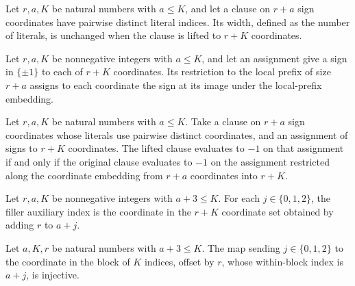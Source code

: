 \begin{theorem}
\label{FABL.liftLocalClause_width}
\leanok
{}
Let $r,a,K$ be natural numbers with $a\le K$, and let a clause on $r+a$ sign coordinates
have pairwise distinct literal indices. Its width, defined as the number of literals, is
unchanged when the clause is lifted to $r+K$ coordinates.
\end{theorem}

\begin{definition}
\label{FABL.restrictLocalAssignment}
\leanok
{}
Let $r,a,K$ be nonnegative integers with $a\le K$, and let an assignment give a sign in
$\{\pm1\}$ to each of $r+K$ coordinates. Its restriction to the local prefix of size
$r+a$ assigns to each coordinate the sign at its image under the local-prefix embedding.
\end{definition}

\begin{theorem}
\label{FABL.liftLocalClause_eval_eq_neg_one_iff}
\leanok
{}
Let $r,a,K$ be natural numbers with $a\le K$. Take a clause on $r+a$ sign coordinates
whose literals use pairwise distinct coordinates, and an assignment of signs to $r+K$
coordinates. The lifted clause evaluates to $-1$ on that assignment if and only if the
original clause evaluates to $-1$ on the assignment restricted along the coordinate
embedding from $r+a$ coordinates into $r+K$.
\end{theorem}

\begin{definition}
\label{FABL.fillerAuxiliaryIndex}
\leanok
Let $r,a,K$ be nonnegative integers with $a+3\le K$. For each $j\in\{0,1,2\}$, the
filler auxiliary index is the coordinate in the $r+K$ coordinate set obtained by adding
$r$ to $a+j$.
\end{definition}

\begin{theorem}
\label{FABL.fillerAuxiliaryIndex_injective}
\leanok
{}
Let $a,K,r$ be natural numbers with $a+3\le K$. The map sending $j\in\{0,1,2\}$ to the
coordinate in the block of $K$ indices, offset by $r$, whose within-block index is
$a+j$, is injective.
\end{theorem}

